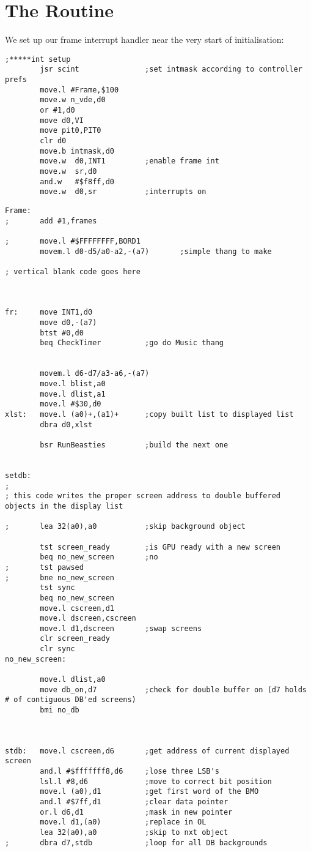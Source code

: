 \section*{The  Routine}
We set up our frame interrupt handler near the very start of initialisation:

\begin{lstlisting}
;*****int setup
        jsr scint               ;set intmask according to controller prefs
        move.l #Frame,$100
        move.w n_vde,d0
        or #1,d0
        move d0,VI
        move pit0,PIT0
        clr d0
        move.b intmask,d0
        move.w  d0,INT1         ;enable frame int
        move.w  sr,d0
        and.w   #$f8ff,d0
        move.w  d0,sr           ;interrupts on
\end{lstlisting}

\begin{lstlisting}
Frame:
;       add #1,frames

;       move.l #$FFFFFFFF,BORD1
        movem.l d0-d5/a0-a2,-(a7)       ;simple thang to make

; vertical blank code goes here



fr:     move INT1,d0
        move d0,-(a7)
        btst #0,d0
        beq CheckTimer          ;go do Music thang


        movem.l d6-d7/a3-a6,-(a7)
        move.l blist,a0
        move.l dlist,a1
        move.l #$30,d0
xlst:   move.l (a0)+,(a1)+      ;copy built list to displayed list
        dbra d0,xlst

        bsr RunBeasties         ;build the next one


setdb:          
;
; this code writes the proper screen address to double buffered objects in the display list

;       lea 32(a0),a0           ;skip background object

        tst screen_ready        ;is GPU ready with a new screen
        beq no_new_screen       ;no
;       tst pawsed
;       bne no_new_screen
        tst sync
        beq no_new_screen
        move.l cscreen,d1
        move.l dscreen,cscreen
        move.l d1,dscreen       ;swap screens
        clr screen_ready
        clr sync
no_new_screen:

        move.l dlist,a0
        move db_on,d7           ;check for double buffer on (d7 holds # of contiguous DB'ed screens)
        bmi no_db



stdb:   move.l cscreen,d6       ;get address of current displayed screen
        and.l #$fffffff8,d6     ;lose three LSB's
        lsl.l #8,d6             ;move to correct bit position
        move.l (a0),d1          ;get first word of the BMO
        and.l #$7ff,d1          ;clear data pointer
        or.l d6,d1              ;mask in new pointer
        move.l d1,(a0)          ;replace in OL
        lea 32(a0),a0           ;skip to nxt object
;       dbra d7,stdb            ;loop for all DB backgrounds



\end{lstlisting}
